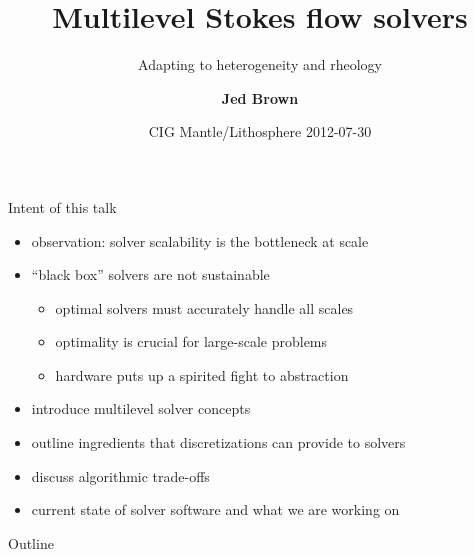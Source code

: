\documentclass{beamer}
\title{Multilevel Stokes flow solvers}
\subtitle{Adapting to heterogeneity and rheology}
\author{{\bf Jed Brown}}
\institute
{
  {Mathematics and Computer Science Division, Argonne National Laboratory} \\
}
\date{CIG Mantle/Lithosphere 2012-07-30}
\begin{document}
\lstset{language=C}
\normalem

\begin{frame}
  \titlepage
\end{frame}

\begin{frame}{Intent of this talk}
  \begin{itemize}
  \item observation: solver scalability is the bottleneck at scale
  \item ``black box'' solvers are not sustainable
    \begin{itemize}
    \item optimal solvers must accurately handle all scales
    \item optimality is crucial for large-scale problems
    \item hardware puts up a spirited fight to abstraction
    \end{itemize}
  \item introduce multilevel solver concepts
  \item outline ingredients that discretizations can provide to solvers
  \item discuss algorithmic trade-offs
  \item current state of solver software and what we are working on
  \end{itemize}
\end{frame}

\begin{frame}{Outline}
  \tableofcontents
\end{frame}
\end{document}
